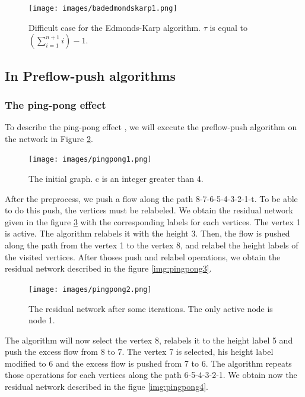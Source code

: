 \begin{figure}[h]
\centering
\texttt{[image: images/badedmondskarp1.png]}
\caption{Difficult case for the Edmonds-Karp algorithm. $\tau$ is equal to $(\sum\limits_{i=1}^{n+1} i) - 1$.}
\label{img:badedmondskarp}
\end{figure}

\subsection{In Preflow-push algorithms}

\subsubsection{The ping-pong effect}

To describe the ping-pong effect \cite{pingpongeffect}, we will execute the preflow-push algorithm on the network in Figure \ref{img:pingpong1}.

\begin{figure}[h]
\centering
\texttt{[image: images/pingpong1.png]}
\caption{The initial graph. c is an integer greater than 4.}
\label{img:pingpong1}
\end{figure}

After the preprocess, we push a flow along the path 8-7-6-5-4-3-2-1-t. To be able to do this push, the vertices must be relabeled. We obtain the residual network given in the figure \ref{img:pingpong2} with the corresponding labels for each vertices. The vertex 1 is active. The algorithm relabels it with the height 3. Then, the flow is pushed along the path from the vertex 1 to the vertex 8, and relabel the height labels of the visited vertices. After thoses push and relabel operations, we obtain the residual network described in the figure \ref{img:pingpong3}.

\begin{figure}[h]
\centering
\texttt{[image: images/pingpong2.png]}
\caption{The residual network after some iterations. The only active node is node 1.}
\label{img:pingpong2}
\end{figure}

The algorithm will now select the vertex 8, relabels it to the height label 5 and push the excess flow from 8 to 7. The vertex 7 is selected, his height label modified to 6 and the excess flow is pushed from 7 to 6. The algorithm repeats those operations for each vertices along the path 6-5-4-3-2-1. We obtain now the residual network described in the figue \ref{img:pingpong4}.

